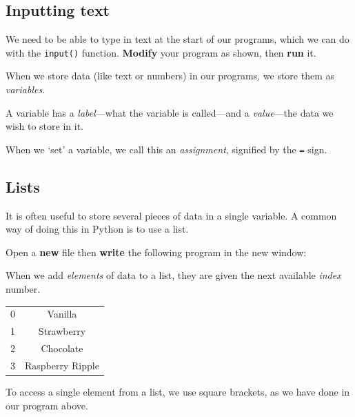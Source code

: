 	\subsection*{Inputting text}
	
		We need to be able to type in text at the start of our programs, which we can do with the \texttt{input()} function.
		\textbf{Modify} your program as shown, then \textbf{run} it.
		
		
		
		\pagebreak[2]
		\begin{aside}[Variables]
			When we store data (like text or numbers) in our programs, we store them as \textit{variables}.
			
			A variable has a \textit{label}---what the variable is called---and a \textit{value}---the data we wish to store in it.
			
			When we `set' a variable, we call this an \textit{assignment}, signified by the \texttt{=} sign.
		\end{aside}
	
	\subsection*{Lists}
	
		It is often useful to store several pieces of data in a single variable. A common way of doing this in Python is to use a list.
		
		Open a \textbf{new} file then \textbf{write} the following program in the new window:
		
		
		
		\begin{aside}[Lists]
			When we add \textit{elements} of data to a list, they are given the next available \textit{index} number.
			
			\vspace{4pt}
			\begin{tabular}{c|c}
				0 & Vanilla \\ 
				1 & Strawberry \\ 
				2 & Chocolate \\ 
				3 & Raspberry Ripple
			\end{tabular} 
			\vspace{4pt}
						
			To access a single element from a list, we use square brackets, as we have done in our program above.
		\end{aside}
	
